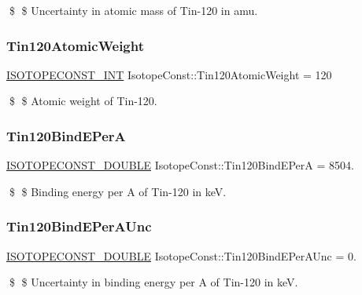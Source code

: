 \$ \$ Uncertainty in atomic mass of Tin-\/120 in amu. \mbox{\label{group___isotope_const-_tin-_sn120_ga1bad6ae07e19f951b7f2f6da233f9e05}} 
\subsubsection{\texorpdfstring{Tin120\+Atomic\+Weight}{Tin120AtomicWeight}}
{\footnotesize\ttfamily \mbox{\hyperlink{group___isotope_const-_macros_ga5f18360b3e99483a35c32d789e62621c}{I\+S\+O\+T\+O\+P\+E\+C\+O\+N\+S\+T\+\_\+\+I\+NT}} Isotope\+Const\+::\+Tin120\+Atomic\+Weight = 120}

\$ \$ Atomic weight of Tin-\/120. \mbox{\label{group___isotope_const-_tin-_sn120_ga3b04922921c9466462bdf2a3e77558d4}} 
\subsubsection{\texorpdfstring{Tin120\+Bind\+E\+PerA}{Tin120BindEPerA}}
{\footnotesize\ttfamily \mbox{\hyperlink{group___isotope_const-_macros_ga8f45a7272ce02c0b4c65c44636ed719a}{I\+S\+O\+T\+O\+P\+E\+C\+O\+N\+S\+T\+\_\+\+D\+O\+U\+B\+LE}} Isotope\+Const\+::\+Tin120\+Bind\+E\+PerA = 8504.}

\$ \$ Binding energy per A of Tin-\/120 in keV. \mbox{\label{group___isotope_const-_tin-_sn120_gadac62f776b6cc12be034b057d420a435}} 
\subsubsection{\texorpdfstring{Tin120\+Bind\+E\+Per\+A\+Unc}{Tin120BindEPerAUnc}}
{\footnotesize\ttfamily \mbox{\hyperlink{group___isotope_const-_macros_ga8f45a7272ce02c0b4c65c44636ed719a}{I\+S\+O\+T\+O\+P\+E\+C\+O\+N\+S\+T\+\_\+\+D\+O\+U\+B\+LE}} Isotope\+Const\+::\+Tin120\+Bind\+E\+Per\+A\+Unc = 0.}

\$ \$ Uncertainty in binding energy per A of Tin-\/120 in keV. \mbox{\label{group___isotope_const-_tin-_sn120_ga7fc28e824162ddb0c37c75c7b0a1dca5}} 
